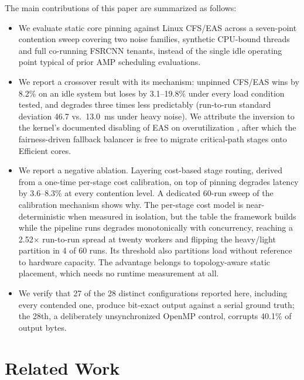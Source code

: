 \documentclass[conference]{IEEEtran}
\begin{document}
The main contributions of this paper are summarized as follows:
\begin{itemize}
\item We evaluate static core pinning against Linux CFS/EAS across a seven-point contention sweep covering two noise families, synthetic CPU-bound threads and full co-running FSRCNN tenants, instead of the single idle operating point typical of prior AMP scheduling evaluations.
\item We report a crossover result with its mechanism: unpinned CFS/EAS wins by 8.2\% on an idle system but loses by 3.1--19.8\% under every load condition tested, and degrades three times less predictably (run-to-run standard deviation 46.7 vs.\ 13.0~ms under heavy noise). We attribute the inversion to the kernel's documented disabling of EAS on overutilization \cite{linuxeas}, after which the fairness-driven fallback balancer is free to migrate critical-path stages onto Efficient cores.
\item We report a negative ablation. Layering cost-based stage routing, derived from a one-time per-stage cost calibration, on top of pinning degrades latency by 3.6--8.3\% at every contention level. A dedicated 60-run sweep of the calibration mechanism shows why. The per-stage cost model is near-deterministic when measured in isolation, but the table the framework builds while the pipeline runs degrades monotonically with concurrency, reaching a 2.52$\times$ run-to-run spread at twenty workers and flipping the heavy/light partition in 4 of 60 runs. Its threshold also partitions load without reference to hardware capacity. The advantage belongs to topology-aware static placement, which needs no runtime measurement at all.
\item We verify that 27 of the 28 distinct configurations reported here, including every contended one, produce bit-exact output against a serial ground truth; the 28th, a deliberately unsynchronized OpenMP control, corrupts 40.1\% of output bytes.
\end{itemize}

\section{Related Work}
\end{document}
